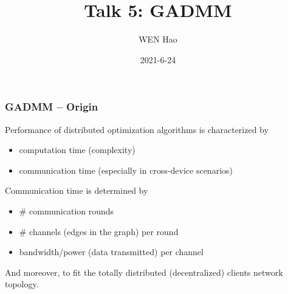 \usepackage{nccmath}




\title[Personalization]{Talk 5: GADMM}
\date{2021-6-24}
\author[]{WEN Hao}




\setlength{\belowdisplayskip}{5pt} \setlength{\belowdisplayshortskip}{5pt}
\setlength{\abovedisplayskip}{5pt} \setlength{\abovedisplayshortskip}{5pt}


\begin{frame}
\titlepage %
\end{frame}


\begin{frame}
\frametitle{GADMM -- Origin}

Performance of distributed optimization algorithms is characterized by
\begin{itemize}
    \item computation time (complexity)
    \item communication time (especially in cross-device scenarios)
\end{itemize}

\pause
\vspace{0.6em}

Communication time is determined by
\begin{itemize}
    \item \# communication rounds
    \item {\color{green} \# channels (edges in the graph) per round}
    \item {\color{pink} bandwidth/power (data transmitted) per channel}
\end{itemize}

\pause
\vspace{0.6em}

And moreover, to fit the totally distributed (decentralized) clients network topology.

\end{frame}

